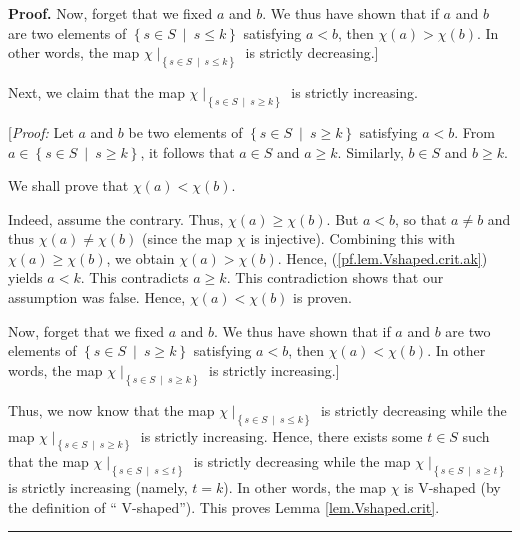\documentclass[numbers=enddot,12pt,final,onecolumn,notitlepage]{scrartcl}%
\theoremstyle{definition}
\newenvironment{proof}[1][Proof]{\noindent\textbf{#1.} }{\ \rule{0.5em}{0.5em}}
\newenvironment{verlong}{}{}
\begin{document}
\begin{verlong}
\begin{proof}
Now, forget that we fixed $a$ and $b$. We thus have shown that if $a$ and $b$
are two elements of $\left\{  s\in S\ \mid\ s\leq k\right\}  $ satisfying
$a<b$, then $\chi\left(  a\right)  >\chi\left(  b\right)  $. In other words,
the map $\chi\mid_{\left\{  s\in S\ \mid\ s\leq k\right\}  }$ is strictly decreasing.]

Next, we claim that the map $\chi\mid_{\left\{  s\in S\ \mid\ s\geq k\right\}
}$ is strictly increasing.

[\textit{Proof:} Let $a$ and $b$ be two elements of $\left\{  s\in
S\ \mid\ s\geq k\right\}  $ satisfying $a<b$. From $a\in\left\{  s\in
S\ \mid\ s\geq k\right\}  $, it follows that $a\in S$ and $a\geq k$.
Similarly, $b\in S$ and $b\geq k$.

We shall prove that $\chi\left(  a\right)  <\chi\left(  b\right)  $.

Indeed, assume the contrary. Thus, $\chi\left(  a\right)  \geq\chi\left(
b\right)  $. But $a<b$, so that $a\neq b$ and thus $\chi\left(  a\right)
\neq\chi\left(  b\right)  $ (since the map $\chi$ is injective). Combining
this with $\chi\left(  a\right)  \geq\chi\left(  b\right)  $, we obtain
$\chi\left(  a\right)  >\chi\left(  b\right)  $. Hence,
(\ref{pf.lem.Vshaped.crit.ak}) yields $a<k$. This contradicts $a\geq k$. This
contradiction shows that our assumption was false. Hence, $\chi\left(
a\right)  <\chi\left(  b\right)  $ is proven.

Now, forget that we fixed $a$ and $b$. We thus have shown that if $a$ and $b$
are two elements of $\left\{  s\in S\ \mid\ s\geq k\right\}  $ satisfying
$a<b$, then $\chi\left(  a\right)  <\chi\left(  b\right)  $. In other words,
the map $\chi\mid_{\left\{  s\in S\ \mid\ s\geq k\right\}  }$ is strictly increasing.]

Thus, we now know that the map $\chi\mid_{\left\{  s\in S\ \mid\ s\leq
k\right\}  }$ is strictly decreasing while the map $\chi\mid_{\left\{  s\in
S\ \mid\ s\geq k\right\}  }$ is strictly increasing. Hence, there exists some
$t\in S$ such that the map $\chi\mid_{\left\{  s\in S\ \mid\ s\leq t\right\}
}$ is strictly decreasing while the map $\chi\mid_{\left\{  s\in
S\ \mid\ s\geq t\right\}  }$ is strictly increasing (namely, $t=k$). In other
words, the map $\chi$ is V-shaped (by the definition of \textquotedblleft
V-shaped\textquotedblright). This proves Lemma \ref{lem.Vshaped.crit}.
\end{proof}
\end{verlong}
\end{document}
